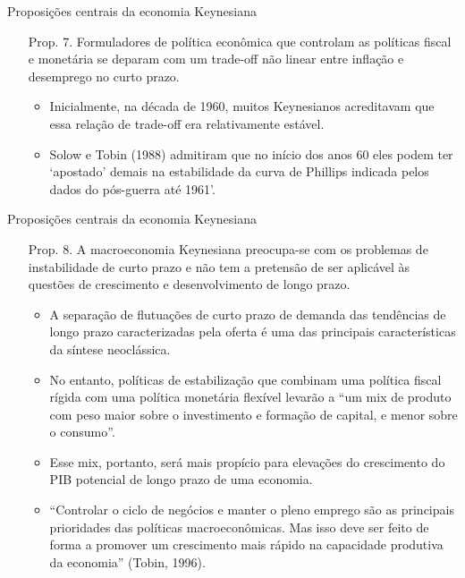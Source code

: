 \documentclass[10pt]{beamer}
\begin{document}
\begin{frame}{Proposições centrais da economia Keynesiana}
    \begin{enumerate}
        \item[Prop. 7.] Formuladores de política econômica que controlam as políticas fiscal e monetária se deparam com um trade-off não linear entre inflação e desemprego no curto prazo.
        \bigskip
        \begin{itemize}
            \item Inicialmente, na década de 1960, muitos Keynesianos acreditavam que essa relação de trade-off era relativamente estável.
            \bigskip
            \item Solow e Tobin (1988) admitiram que no início dos anos 60 eles podem ter `apostado' demais na estabilidade da curva de Phillips indicada pelos dados do pós-guerra até 1961'.
        \end{itemize}
    \end{enumerate}
\end{frame}

\begin{frame}{Proposições centrais da economia Keynesiana}
    \begin{enumerate}
        \item[Prop. 8.] A macroeconomia Keynesiana preocupa-se com os problemas de instabilidade de curto prazo e não tem a pretensão de ser aplicável às questões de crescimento e desenvolvimento de longo prazo.
        \bigskip
        \begin{itemize}
            \item A separação de flutuações de curto prazo de demanda das tendências de longo prazo caracterizadas pela oferta é uma das principais características da síntese neoclássica.
            \bigskip
            \item No entanto, políticas de estabilização que combinam uma política fiscal rígida com uma política monetária flexível levarão a ``um mix de produto com peso maior sobre o investimento e formação de capital, e menor sobre o consumo''.
            \bigskip
            \item Esse mix, portanto, será mais propício para elevações do crescimento do PIB potencial de longo prazo de uma economia.
            \bigskip
            \item ``Controlar o ciclo de negócios e manter o pleno emprego são as principais prioridades das políticas macroeconômicas. Mas isso deve ser feito de forma a promover um crescimento mais rápido na capacidade produtiva da economia'' (Tobin, 1996).
        \end{itemize}
    \end{enumerate}
\end{frame}
\end{document}
